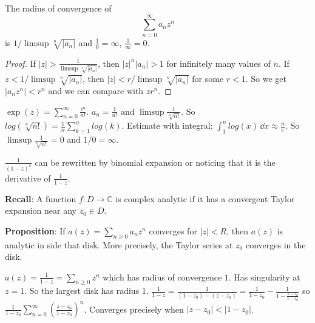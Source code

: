 \documentclass{report}
\begin{document}
\begin{theorem}{}
    The radius of convergence of 
        \begin{equation*}
            \sum_{n = 0}^{\infty} a_{n}z^{n}
        \end{equation*}
    is $1/ \limsup \sqrt[n]{\lvert a_{n} \rvert}$ and $\frac{1}{0} = \infty$, $\frac{1}{\infty} = 0$.
\end{theorem}
    \begin{proof}
        If $\lvert z \rvert > \frac{1}{\limsup \sqrt[n]{\lvert a_{n} \rvert}}$, then $\lvert z \rvert^{n}\lvert a_{n} \rvert > 1$ for infinitely many values of $n$. If $z < 1/\limsup \sqrt[n]{\lvert a_{n} \rvert}$, then $\lvert z \rvert < r/\limsup \sqrt[n]{\lvert a_{n} \rvert}$ for some $r < 1$. So we get $\lvert a_{n}z^{n} \rvert < r^{n}$ and we can compare with $zr^{n}$.
    \end{proof}

\begin{examples}
    \begin{example}
        $\exp(z) = \sum_{n = 0}^{\infty} \frac{z^{n}}{n!}$. $a_{n} = \frac{1}{n!}$ and $\limsup \frac{1}{\sqrt[n]{n!}}$. So $log(\sqrt[n]{n!}) = \frac{1}{n}\sum_{k = 1}^{n}log(k)$. Estimate with integral: $\int_{1}^{n} log(x) \, \dd{x} \approx \frac{n}{e}$. So $\limsup \frac{1}{\sqrt[n]{n!}} = 0$ and $1/0 = \infty$.
    \end{example}
    \begin{example}
        $\frac{1}{(1 - z)^{k}}$ can be rewritten by binomial expansion or noticing that it is the derivative of $\frac{1}{1 - z}$.
    \end{example}
\end{examples}

\textbf{Recall}: A function $f : D \rightarrow \mathbb{C}$ is complex analytic if it has a convergent Taylor expansion near any $z_{0} \in D$.

\textbf{Proposition}: If $a(z) = \sum_{n \geq 0} a_{n}z^{n}$ converges for $\lvert z \rvert < R$, then $a(z)$ is analytic in side that disk. More precisely, the Taylor series at $z_{0}$ converges in the disk.

\begin{examples}
    \begin{example}
        $a(z) = \frac{1}{1 - z} = \sum_{n \geq 0}z^{n}$ which has radius of convergence $1$. Has singularity at $z = 1$. So the largest disk has radius $1$. $\frac{1}{1 - z} = \frac{1}{(1 - z_{0}) - (z - z_{0})} = \frac{1}{1 - z_{0}} - \frac{1}{1 - \frac{z - z_{0}}{1 - z_{0}}}$ so $\frac{1}{1 - z_{0}} \sum_{n = 0}^{\infty}(\frac{z - z_{0}}{1 - z_{0}})^{n}$. Converges precisely when $\lvert z - z_{0} \rvert < \lvert 1 - z_{0} \rvert$.
    \end{example}
\end{examples}
\end{document}
